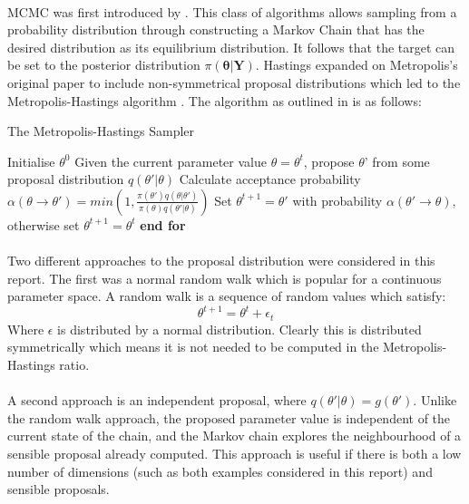 \documentclass[12,fleqn]{article}
\theoremstyle{definition}
\theoremstyle{plain}
\begin{document}
\paragraph{}
MCMC was first introduced by . This class of algorithms allows sampling from a probability distribution through constructing a Markov Chain that has the desired distribution as its equilibrium distribution. It follows that the target can be set to the posterior distribution $\pi(\boldsymbol{\theta} | \boldsymbol{Y})$. Hastings expanded on Metropolis's original paper to include non-symmetrical proposal distributions which led to the Metropolis-Hastings algorithm \cite{hastings}. The algorithm as outlined in  is as follows:
\begin{algorithm}
\caption{The Metropolis-Hastings Sampler}
\begin{algorithmic}[1]
\State Initialise $\theta^0$
\State     Given the current parameter value $\theta = \theta^t$, propose $\theta$' 	from some proposal distribution $q(\theta'|\theta)$
\State Calculate acceptance probability $\alpha(\theta \rightarrow \theta') = min\left( 1, \frac{\pi(\theta')q(\theta|\theta')}{\pi(\theta)q(\theta'|\theta)} \right) $
\State Set $\theta^{t+1} = \theta'$  with probability  $\alpha(\theta' \rightarrow \theta)$, otherwise set $\theta^{t+1} = \theta^t$
\State \textbf{end for}
\end{algorithmic}
\end{algorithm}
\par



\paragraph{}
Two different approaches to the proposal distribution were considered in this report. The first was a normal random walk which is popular for a continuous parameter space. A random walk is a sequence of random values which satisfy:
\begin{equation*}
\theta^{t+1} = \theta^t + \epsilon_t
\end{equation*}
Where $\epsilon$ is distributed by a normal distribution. Clearly this is distributed symmetrically which means it is not needed to be computed in the Metropolis-Hastings ratio.
\par

\paragraph{}
A second approach is an independent proposal, where $q(\theta'|\theta) = g(\theta').$ Unlike the random walk approach, the proposed parameter value is independent of the current state of the chain, and the Markov chain explores the neighbourhood of a sensible proposal already computed. This approach is useful if there is both a low number of dimensions (such as both examples considered in this report) and sensible proposals.
\par
\end{document}
